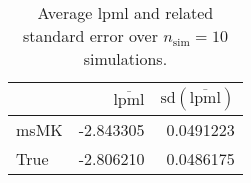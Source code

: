 \begin{table}[H]

\caption{Average lpml and related standard error over $n_{\text{sim}} = 10$ simulations.}
\centering
\begin{tabular}[t]{lrr}
\toprule
  & $\overbar{\text{lpml}}$ & $\text{sd}(\overbar{\text{lpml}})$\\
\midrule
msMK & -2.843305 & 0.0491223\\
True & -2.806210 & 0.0486175\\
\bottomrule
\end{tabular}
\end{table}